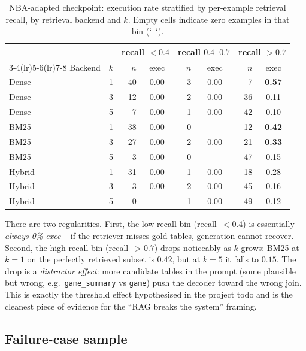 \documentclass[11pt,a4paper]{article}
\begin{document}
\begin{table}[h]
\centering
\caption{NBA-adapted checkpoint: execution rate stratified by per-example
retrieval recall, by retrieval backend and $k$. Empty cells indicate zero
examples in that bin (`--`).}
\label{tab:bins}
\small
\begin{tabular}{l c r c r c r c}
\toprule
        &     & \multicolumn{2}{c}{recall $<0.4$}
              & \multicolumn{2}{c}{recall $0.4$--$0.7$}
              & \multicolumn{2}{c}{recall $>0.7$} \\
\cmidrule(lr){3-4}\cmidrule(lr){5-6}\cmidrule(lr){7-8}
Backend & $k$ & $n$ & exec & $n$ & exec & $n$ & exec \\
\midrule
Dense   & 1 & 40 & 0.00 & 3 & 0.00 & 7  & \textbf{0.57} \\
Dense   & 3 & 12 & 0.00 & 2 & 0.00 & 36 & 0.11 \\
Dense   & 5 & 7  & 0.00 & 1 & 0.00 & 42 & 0.10 \\
BM25    & 1 & 38 & 0.00 & 0 & --   & 12 & \textbf{0.42} \\
BM25    & 3 & 27 & 0.00 & 2 & 0.00 & 21 & \textbf{0.33} \\
BM25    & 5 & 3  & 0.00 & 0 & --   & 47 & 0.15 \\
Hybrid  & 1 & 31 & 0.00 & 1 & 0.00 & 18 & 0.28 \\
Hybrid  & 3 & 3  & 0.00 & 2 & 0.00 & 45 & 0.16 \\
Hybrid  & 5 & 0  & --   & 1 & 0.00 & 49 & 0.12 \\
\bottomrule
\end{tabular}
\end{table}

There are two regularities. First, the low-recall bin
(recall~$<0.4$) is essentially \emph{always 0\% exec} -- if the retriever
misses gold tables, generation cannot recover. Second, the high-recall bin
(recall~$>0.7$) drops noticeably as $k$ grows: BM25 at $k=1$ on the perfectly
retrieved subset is $0.42$, but at $k=5$ it falls to $0.15$. The drop is a
\emph{distractor effect}: more candidate tables in the prompt (some
plausible but wrong, e.g.\ \texttt{game\_summary} vs \texttt{game}) push the
decoder toward the wrong join. This is exactly the threshold effect
hypothesised in the project todo and is the cleanest piece of evidence for the
``RAG breaks the system'' framing.

\subsection{Failure-case sample}
\label{sec:failures}
\end{document}
